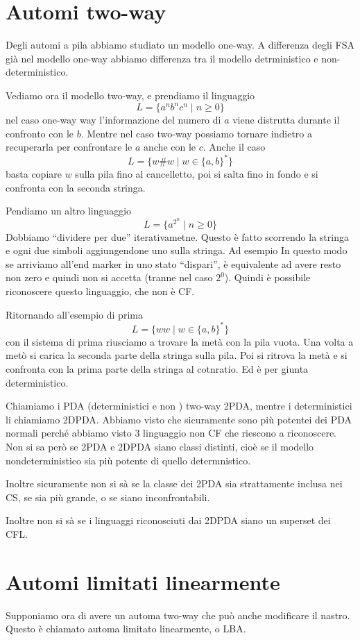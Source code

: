 \documentclass[12pt]{article}
\begin{document}
\tableofcontents
\newpage
\section{Automi two-way}
Degli automi a pila abbiamo studiato un modello one-way.
A differenza degli FSA già nel modello one-way abbiamo differenza tra il modello detrministico e non-deterministico.

Vediamo ora il modello two-way, e prendiamo il linguaggio
$$ L = \{ a^n b^n c^n \mid n \geq 0 \} $$
nel caso one-way way l'informazione del numero di $a$ viene distrutta durante il confronto con le $b$.
Mentre nel caso two-way possiamo tornare indietro a recuperarla per confrontare le $a$ anche con le $c$.
Anche il caso 
$$ L = \{ w \# w \mid w \in \{a, b\}^* \} $$
basta copiare $w$ sulla pila fino al cancelletto, poi si salta fino in fondo e si confronta con la seconda stringa.

Pendiamo un altro linguaggio
$$ L = \{ a^{2^n} \mid n \geq 0 \} $$
Dobbiamo ``dividere per due'' iterativametne.
Questo è fatto scorrendo la stringa e ogni due simboli aggiungendone uno sulla stringa.
Ad esempio
In questo modo se arriviamo all'end marker in uno stato ``dispari'', è equivalente ad avere resto non zero e quindi non si accetta (tranne nel caso $2^0$).
Quindi è possibile riconoscere questo linguaggio, che non è CF.

Ritornando all'esempio di prima
$$ L = \{ w w \mid w \in \{a, b\}^* \} $$
con il sistema di prima riusciamo a trovare la metà con la pila vuota.
Una volta a metò si carica la seconda parte della stringa sulla pila.
Poi si ritrova la metà e si confronta con la prima parte della stringa al cotnratio.
Ed è per giunta deterministico.

Chiamiamo i PDA (deterministici e non ) two-way 2PDA, mentre i deterministici li chiamiamo 2DPDA.
Abbiamo visto che sicuramente sono più potentei dei PDA normali perché abbiamo visto 3 linguaggio non CF che riescono a riconoscere.
Non si sa però se 2PDA e 2DPDA siano classi distinti, cioè se il modello nondeterministico sia più potente di quello determnistico.

Inoltre sicuramente non si sà se la classe dei 2PDA sia strattamente inclusa nei CS, se sia più grande, o se siano inconfrontabili.

Inoltre non si sà se i linguaggi riconosciuti dai 2DPDA siano un superset dei CFL.

\section{Automi limitati linearmente}
Supponiamo ora di avere un automa two-way che può anche modificare il nastro.
Questo è chiamato automa limitato linearmente, o LBA.
\end{document}

